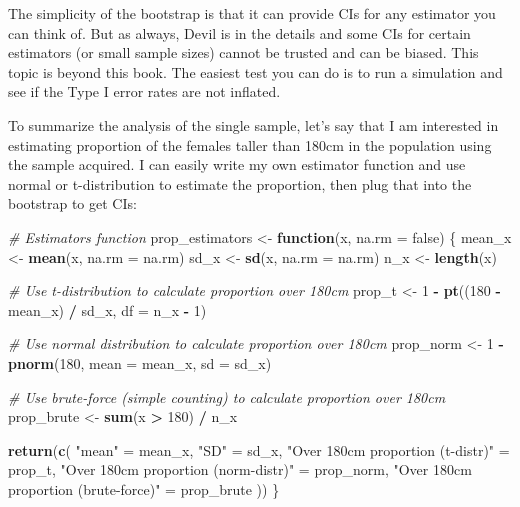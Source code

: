 \documentclass[
]{book}
\newenvironment{Shaded}{\begin{snugshade}}{\end{snugshade}}
\newcommand{\CommentTok}[1]{\textcolor[rgb]{0.56,0.35,0.01}{\textit{#1}}}
\newcommand{\ControlFlowTok}[1]{\textcolor[rgb]{0.13,0.29,0.53}{\textbf{#1}}}
\newcommand{\DataTypeTok}[1]{\textcolor[rgb]{0.13,0.29,0.53}{#1}}
\newcommand{\DecValTok}[1]{\textcolor[rgb]{0.00,0.00,0.81}{#1}}
\newcommand{\KeywordTok}[1]{\textcolor[rgb]{0.13,0.29,0.53}{\textbf{#1}}}
\newcommand{\NormalTok}[1]{#1}
\newcommand{\OperatorTok}[1]{\textcolor[rgb]{0.81,0.36,0.00}{\textbf{#1}}}
\newcommand{\StringTok}[1]{\textcolor[rgb]{0.31,0.60,0.02}{#1}}
\begin{document}
The simplicity of the bootstrap is that it can provide CIs for any estimator you can think of. But as always, Devil is in the details and some CIs for certain estimators (or small sample sizes) cannot be trusted and can be biased. This topic is beyond this book. The easiest test you can do is to run a simulation and see if the Type I error rates are not inflated.

To summarize the analysis of the single sample, let's say that I am interested in estimating proportion of the females taller than 180cm in the population using the sample acquired. I can easily write my own estimator function and use normal or t-distribution to estimate the proportion, then plug that into the bootstrap to get CIs:

\begin{Shaded}
\begin{Highlighting}[]
\CommentTok{\# Estimators function}
\NormalTok{prop\_estimators <{-}}\StringTok{ }\ControlFlowTok{function}\NormalTok{(x, }\DataTypeTok{na.rm =}\NormalTok{ false) \{}
\NormalTok{  mean\_x <{-}}\StringTok{ }\KeywordTok{mean}\NormalTok{(x, }\DataTypeTok{na.rm =}\NormalTok{ na.rm)}
\NormalTok{  sd\_x <{-}}\StringTok{ }\KeywordTok{sd}\NormalTok{(x, }\DataTypeTok{na.rm =}\NormalTok{ na.rm)}
\NormalTok{  n\_x <{-}}\StringTok{ }\KeywordTok{length}\NormalTok{(x)}

  \CommentTok{\# Use t{-}distribution to calculate proportion over 180cm}
\NormalTok{  prop\_t <{-}}\StringTok{ }\DecValTok{1} \OperatorTok{{-}}\StringTok{ }\KeywordTok{pt}\NormalTok{((}\DecValTok{180} \OperatorTok{{-}}\StringTok{ }\NormalTok{mean\_x) }\OperatorTok{/}\StringTok{ }\NormalTok{sd\_x, }\DataTypeTok{df =}\NormalTok{ n\_x }\OperatorTok{{-}}\StringTok{ }\DecValTok{1}\NormalTok{)}

  \CommentTok{\# Use normal distribution to calculate proportion over 180cm}
\NormalTok{  prop\_norm <{-}}\StringTok{ }\DecValTok{1} \OperatorTok{{-}}\StringTok{ }\KeywordTok{pnorm}\NormalTok{(}\DecValTok{180}\NormalTok{, }\DataTypeTok{mean =}\NormalTok{ mean\_x, }\DataTypeTok{sd =}\NormalTok{ sd\_x)}

  \CommentTok{\# Use \textasciigrave{}brute{-}force\textasciigrave{} (simple counting) to calculate proportion over 180cm}
\NormalTok{  prop\_brute <{-}}\StringTok{ }\KeywordTok{sum}\NormalTok{(x }\OperatorTok{>}\StringTok{ }\DecValTok{180}\NormalTok{) }\OperatorTok{/}\StringTok{ }\NormalTok{n\_x}

  \KeywordTok{return}\NormalTok{(}\KeywordTok{c}\NormalTok{(}
    \StringTok{"mean"}\NormalTok{ =}\StringTok{ }\NormalTok{mean\_x,}
    \StringTok{"SD"}\NormalTok{ =}\StringTok{ }\NormalTok{sd\_x,}
    \StringTok{"Over 180cm proportion (t{-}distr)"}\NormalTok{ =}\StringTok{ }\NormalTok{prop\_t,}
    \StringTok{"Over 180cm proportion (norm{-}distr)"}\NormalTok{ =}\StringTok{ }\NormalTok{prop\_norm,}
    \StringTok{"Over 180cm proportion (brute{-}force)"}\NormalTok{ =}\StringTok{ }\NormalTok{prop\_brute}
\NormalTok{  ))}
\NormalTok{\}}


\end{Highlighting}
\end{Shaded}
\end{document}
